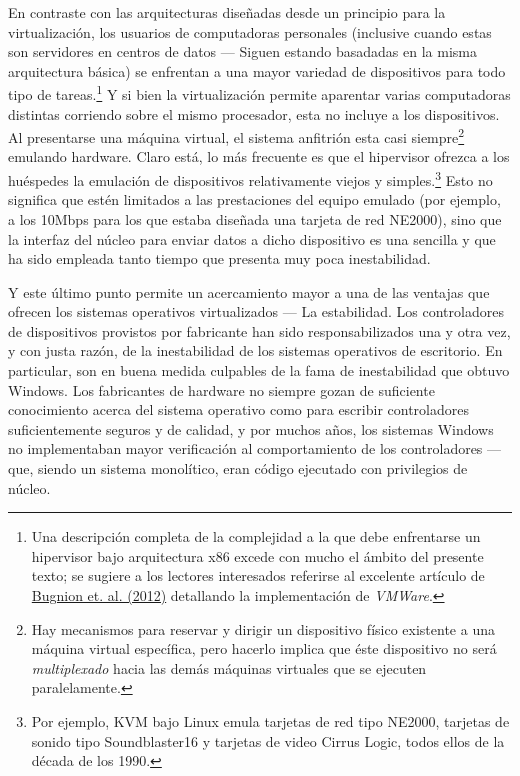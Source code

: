 \documentclass[11pt,fleqn]{book} %
\begin{document}
En contraste con las arquitecturas diseñadas desde un principio para
la virtualización, los usuarios de computadoras personales (inclusive
cuando estas son servidores en centros de datos — Siguen estando
basadadas en la misma arquitectura básica) se enfrentan a una 
mayor variedad de dispositivos para todo tipo de tareas.\footnote{Una
descripción completa de la complejidad a la que debe enfrentarse un
hipervisor bajo arquitectura x86 excede con mucho el ámbito del
presente texto; se sugiere a los lectores interesados referirse al
excelente artículo de \href{https://dl.acm.org/citation.cfm?doid=2382553.2382554}{Bugnion et. al. (2012)} detallando la
implementación de \emph{VMWare}. } Y si bien la virtualización permite
aparentar varias computadoras distintas corriendo sobre el mismo
procesador, esta no incluye a los dispositivos. Al presentarse una
máquina virtual, el sistema anfitrión esta casi siempre\footnote{Hay
mecanismos para reservar y dirigir un dispositivo físico existente a
una máquina virtual específica, pero hacerlo implica que éste
dispositivo no será \emph{multiplexado} hacia las demás máquinas virtuales
que se ejecuten paralelamente. } emulando hardware. Claro está, lo más
frecuente es que el hipervisor ofrezca a los huéspedes la emulación de
dispositivos relativamente viejos y simples.\footnote{Por ejemplo, KVM
bajo Linux emula tarjetas de red tipo NE2000, tarjetas de sonido tipo
Soundblaster16 y tarjetas de video Cirrus Logic, todos ellos de la
década de los 1990. } Esto no significa que estén limitados a las
prestaciones del equipo emulado (por ejemplo, a los 10Mbps para los
que estaba diseñada una tarjeta de red NE2000), sino que la interfaz
del núcleo para enviar datos a dicho dispositivo es una sencilla y que
ha sido empleada tanto tiempo que presenta muy poca inestabilidad.

Y este último punto permite un acercamiento mayor a una de las ventajas que
ofrecen los sistemas operativos virtualizados — La estabilidad. Los
controladores de dispositivos provistos por fabricante han sido
responsabilizados una y otra vez, y con justa razón, de la
inestabilidad de los sistemas operativos de escritorio. En particular,
son en buena medida culpables de la fama de inestabilidad que obtuvo
Windows. Los fabricantes de hardware no siempre gozan de suficiente
conocimiento acerca del sistema operativo como para escribir
controladores suficientemente seguros y de calidad, y por muchos años,
los sistemas Windows no implementaban mayor verificación al
comportamiento de los controladores — que, siendo un sistema
monolítico, eran código ejecutado con privilegios de núcleo.
\end{document}
